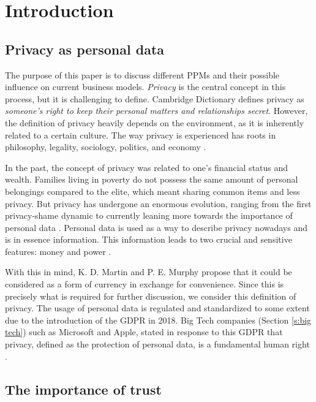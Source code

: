 \section{Introduction}

\subsection{Privacy as personal data}
\label{s:privacy}

The purpose of this paper is to discuss different \gls{PPM}s and their possible influence on current business models.
\textit{Privacy} is the central concept in this process, but it is challenging to define.
Cambridge Dictionary \cite{privacy_dict} defines privacy as \textit{someone's right to keep their personal matters and relationships secret}.
However, the definition of privacy heavily depends on the environment, as it is inherently related to a certain culture. 
The way privacy is experienced has roots in philosophy, legality, sociology, politics, and economy \cite{Nissim2018}.

In the past, the concept of privacy was related to one's financial status and wealth. Families living in poverty do not possess the same amount of personal belongings compared to the elite, which meant sharing common items and less privacy.
But privacy has undergone an enormous evolution, ranging from the first privacy-shame dynamic to currently leaning more towards the importance of personal data \cite{Hist2007}. 
Personal data is used as a way to describe privacy nowadays and is in essence information.
This information leads to two crucial and sensitive features: money and power \cite{Hist2007}.

With this in mind, K. D. Martin and P. E. Murphy \cite{Martin2017} propose that it could be considered as a form of currency in exchange for convenience.
Since this is precisely what is required for further discussion, we consider this definition of privacy. 
The usage of personal data is regulated and standardized to some extent due to the introduction of the \gls{GDPR} in 2018. Big Tech companies (Section \ref{s:big tech}) such as Microsoft and Apple, stated in response to this \gls{GDPR} that privacy, defined as the protection of personal data, is a fundamental human right \cite{Schwartz2019}. 

\subsection{The importance of trust}

